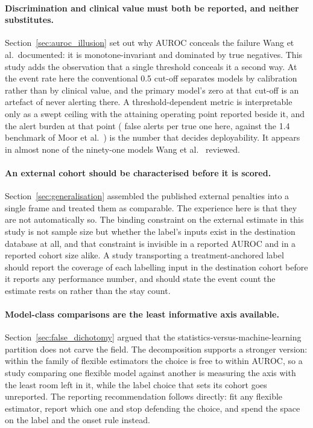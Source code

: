 \paragraph{Discrimination and clinical value must both be reported, and neither
substitutes.}
Section~\ref{sec:auroc_illusion} set out why AUROC conceals the failure Wang et
al.\ documented: it is monotone-invariant and dominated by true negatives.
This study adds the observation that a single threshold conceals it a second
way. At the event rate here the conventional 0.5 cut-off separates models by
calibration rather than by clinical value, and the primary model's zero at that
cut-off is an artefact of never alerting there. A threshold-dependent metric is
interpretable only as a swept ceiling with the attaining operating point
reported beside it, and the alert burden at that point (\pcUtilityOptBurdenGbtB{} false alerts per true one here, against the 1.4
benchmark of Moor et al.\ \cite{moor2023review}) is the number that decides
deployability. It appears in almost none of the ninety-one models Wang et al.\
\cite{wang2025srpm} reviewed.

\paragraph{An external cohort should be characterised before it is scored.}
Section~\ref{sec:generalisation} assembled the published external penalties
into a single frame and treated them as comparable. The experience here is that
they are not automatically so. The binding constraint on the external estimate
in this study is not sample size but whether the label's inputs exist in the
destination database at all, and that constraint is invisible in a reported
AUROC and in a reported cohort size alike. A study transporting a
treatment-anchored label should report the coverage of each labelling input in
the destination cohort before it reports any performance number, and should
state the event count the estimate rests on rather than the stay count.

\paragraph{Model-class comparisons are the least informative axis available.}
Section~\ref{sec:false_dichotomy} argued that the statistics-versus-machine-learning
partition does not carve the field. The decomposition supports a stronger
version: within the family of flexible estimators the choice is free to within
\pcHSixEst{} AUROC, so a study comparing one flexible model against another is
measuring the axis with the least room left in it, while the label choice that
sets its cohort goes unreported. The reporting recommendation follows directly: fit any flexible estimator, report which one and stop defending the choice,
and spend the space on the label and the onset rule instead.

